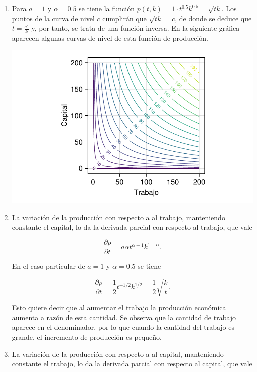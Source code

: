 \documentclass[
  a4paper,
]{scrreport}
\theoremstyle{definition}
\theoremstyle{remark}
\begin{document}
\begin{tcolorbox}[enhanced jigsaw, bottomrule=.15mm, breakable, colframe=quarto-callout-tip-color-frame, toprule=.15mm, opacityback=0, left=2mm, opacitybacktitle=0.6, colback=white, toptitle=1mm, titlerule=0mm, bottomtitle=1mm, arc=.35mm, title=\textcolor{quarto-callout-tip-color}{\faLightbulb}\hspace{0.5em}{Solución}, rightrule=.15mm, colbacktitle=quarto-callout-tip-color!10!white, leftrule=.75mm, coltitle=black]

\begin{enumerate}
\def\labelenumi{\alph{enumi}.}
\item
  Para \(a=1\) y \(\alpha=0.5\) se tiene la función
  \(p(t,k)=1 \cdot t^{0.5}k^{0.5} = \sqrt{tk}\). Los puntos de la curva
  de nivel \(c\) cumplirán que \(\sqrt{tk} = c\), de donde se deduce que
  \(t=\frac{c^2}{k}\) y, por tanto, se trata de una función inversa. En
  la siguiente gráfica aparecen algunas curvas de nivel de esta función
  de producción.

  \includegraphics{11-derivadas-funciones-varias-variables_files/figure-pdf/cell-3-output-1.pdf}
\item
  La variación de la producción con respecto a al trabajo, manteniendo
  constante el capital, lo da la derivada parcial con respecto al
  trabajo, que vale

  \[
  \frac{\partial p}{\partial t} = a\alpha t^{\alpha-1}k^{1-\alpha}.
  \]

  En el caso particular de \(a=1\) y \(\alpha=0.5\) se tiene

  \[
  \frac{\partial p}{\partial t} = \frac{1}{2}t^{-1/2}k^{1/2} = \frac{1}{2}\sqrt{\frac{k}{t}}.
  \]

  Esto quiere decir que al aumentar el trabajo la producción económica
  aumenta a razón de esta cantidad. Se observa que la cantidad de
  trabajo aparece en el denominador, por lo que cuando la cantidad del
  trabajo es grande, el incremento de producción es pequeño.
\item
  La variación de la producción con respecto a al capital, manteniendo
  constante el trabajo, lo da la derivada parcial con respecto al
  capital, que vale


\end{enumerate}
\end{tcolorbox}
\end{document}
